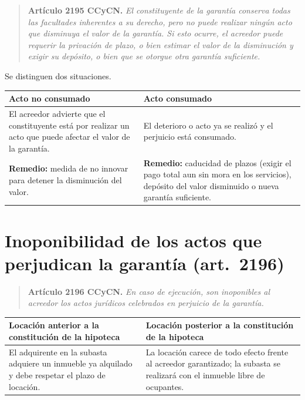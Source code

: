 \documentclass[12pt,oneside]{book}
\begin{document}
\begin{quote}
\textbf{Artículo 2195 CCyCN.} \textit{El constituyente de la garantía conserva todas las facultades inherentes a su derecho, pero no puede realizar ningún acto que disminuya el valor de la garantía. Si esto ocurre, el acreedor puede requerir la privación de plazo, o bien estimar el valor de la disminución y exigir su depósito, o bien que se otorgue otra garantía suficiente.}
\end{quote}

Se distinguen dos situaciones.

\begin{table}[H]
\centering
\begin{tabularx}{\textwidth}{@{}LL@{}}
\toprule
\textbf{Acto no consumado} & \textbf{Acto consumado} \\
\midrule
El acreedor advierte que el constituyente está por realizar un acto que puede afectar el valor de la garantía. & El deterioro o acto ya se realizó y el perjuicio está consumado. \\
\addlinespace
\textbf{Remedio:} medida de no innovar para detener la disminución del valor. & \textbf{Remedio:} caducidad de plazos (exigir el pago total aun sin mora en los servicios), depósito del valor disminuido o nueva garantía suficiente. \\
\bottomrule
\end{tabularx}
\end{table}

\section{Inoponibilidad de los actos que perjudican la garantía (art.~2196)}

\begin{quote}
\textbf{Artículo 2196 CCyCN.} \textit{En caso de ejecución, son inoponibles al acreedor los actos jurídicos celebrados en perjuicio de la garantía.}
\end{quote}

\begin{table}[H]
\centering
\begin{tabularx}{\textwidth}{@{}LL@{}}
\toprule
\textbf{Locación anterior a la constitución de la hipoteca} & \textbf{Locación posterior a la constitución de la hipoteca} \\
\midrule
El adquirente en la subasta adquiere un inmueble ya alquilado y debe respetar el plazo de locación. & La locación carece de todo efecto frente al acreedor garantizado; la subasta se realizará con el inmueble libre de ocupantes. \\
\bottomrule
\end{tabularx}
\end{table}
\end{document}
